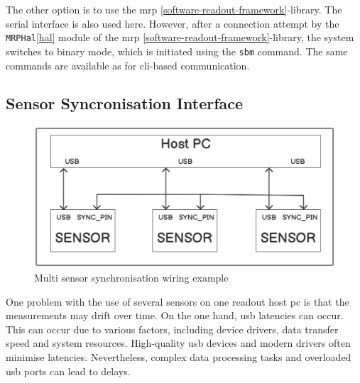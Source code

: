The other option is to use the \gls{mrp}
\ref{software-readout-framework}-library. The serial interface is also
used here. However, after a connection attempt by the
\passthrough{\lstinline!MRPHal!}\ref{hal} module of the \gls{mrp}
\ref{software-readout-framework}-library, the system switches to binary
mode, which is initiated using the \passthrough{\lstinline!sbm!}
command. The same commands are available as for \gls{cli}-based
communication.

\hypertarget{sensor-syncronisation-interface}{%
\subsection{Sensor Syncronisation
Interface}\label{sensor-syncronisation-interface}}

\begin{figure}
\centering
\includegraphics{./generated_images/border_Multi_sensor_synchronisation_wiring_example.png}
\caption{Multi sensor synchronisation wiring example
\label{Multi_sensor_synchronisation_wiring_example.png}}
\end{figure}

One problem with the use of several sensors on one readout host \gls{pc}
is that the measurements may drift over time. On the one hand, \gls{usb}
latencies can occur. This can occur due to various factors, including
device drivers, data transfer speed and system resources. High-quality
\gls{usb} devices and modern drivers often minimise latencies.
Nevertheless, complex data processing tasks and overloaded \gls{usb}
ports can lead to delays.


